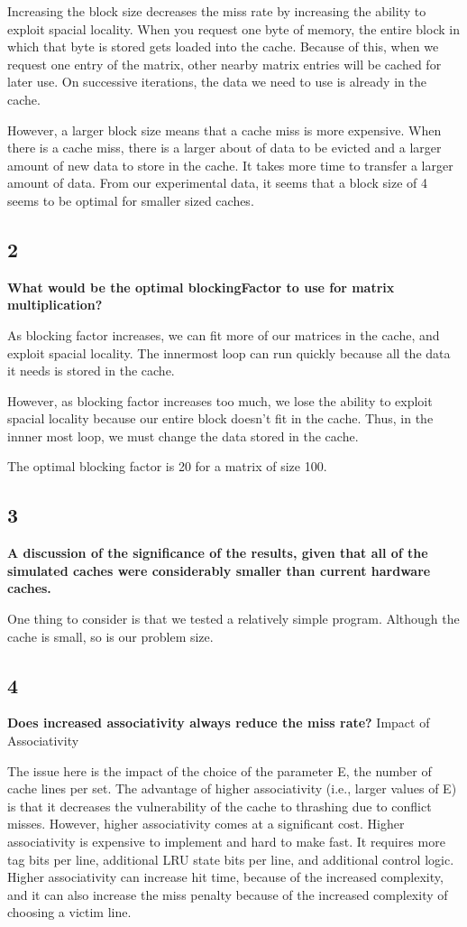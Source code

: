 \documentclass[letterpaper, 12pt, oneside]{memoir}
\begin{document}
Increasing the block size decreases the miss rate by increasing the ability to
exploit spacial locality. When you request one byte of memory, the
entire block in which that byte is stored gets loaded into the cache. Because 
of this, when we request one entry of the matrix, other nearby matrix entries
will be cached for later use. On successive iterations, the data we need to use
is already in the cache.

However, a larger block size means that a cache miss is more expensive. When
there is a cache miss, there is a larger about of data to be evicted and a
larger amount of new data to store in the cache. It takes more time to transfer
a larger amount of data. From our experimental data, it seems that a block size
of 4 seems to be optimal for smaller sized caches.


\subsection{2}
\textbf{What would be the optimal blockingFactor to use for matrix
multiplication?}

As blocking factor increases, we can fit more of our matrices in the cache, 
and exploit spacial locality. The innermost loop can run quickly because
all the data it needs is stored in the cache. 

However, as blocking factor increases too much, we lose the ability to exploit
spacial locality because our entire block doesn't fit in the cache. Thus, 
in the innner most loop, we must change the data stored in the cache.

The optimal blocking factor is 20 for a matrix of size 100.


\subsection{3}
\textbf{A discussion of the significance of the results, given that all of the
simulated caches were considerably smaller than current hardware caches.}

One thing to consider is that we tested a relatively simple program. Although
the cache is small, so is our problem size. 

\subsection{4}
\textbf{Does increased associativity always reduce the miss rate?}
Impact of Associativity

The issue here is the impact of the choice of the parameter E, the number of
cache lines per set. The advantage of higher associativity (i.e., larger values of E)
is that it decreases the vulnerability of the cache to thrashing due to conflict misses.
However, higher associativity comes at a significant cost. Higher associativity is
expensive to implement and hard to make fast. It requires more tag bits per
line, additional LRU state bits per line, and additional control logic. Higher
associativity can increase hit time, because of the increased complexity, and it can
also increase the miss penalty because of the increased complexity of choosing a
victim line.
\end{document}
